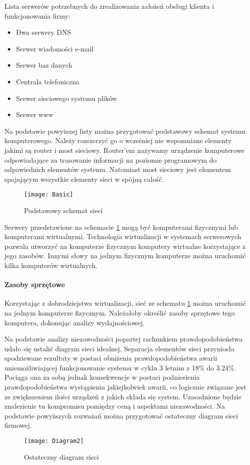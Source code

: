 		
			Lista serwerów potrzebnych do zrealizowania założeń obsługi klienta i funkcjonowania firmy: 
			\begin{itemize}
				\item Dwa serwery DNS
				\item Serwer wiadomości e-mail
				\item Serwer baz danych
				\item Centrala telefoniczna
				\item Serwer sieciowego systemu plików
				\item Serwer www
			\end{itemize}
		
			Na podstawie powyższej listy można przygotować podstawowy schemat systemu komputerowego. Należy rozszerzyć go o wcześniej nie wspomniane elementy jakimi są router i most sieciowy. Router'em nazywamy urządzenie komputerowe odpowiadające za trasowanie informacji na poziomie programowym do odpowiednich elementów systemu. Natomiast most sieciowy jest elementem spajającym wszystkie elementy sieci w spójną całość.
		
			\begin{figure}[H]
				\centering
				\texttt{[image: Basic]}
				\caption{Podstawowy schemat sieci}
				\label{basic_net}
			\end{figure}
			
			\par Serwery przedstawione na schemacie \ref{basic_net} mogą być komputerami fizycznymi lub komputerami wirtualnymi. Technologia wirtualizacji w systemach serwerowych pozwala utworzyć na komputerze fizycznym komputery wirtualne korzystające z jego zasobów. Innymi słowy na jednym fizycznym komputerze można uruchomić kilka komputerów wirtualnych. 
		
		\paragraph{Zasoby sprzętowe}
			\par Korzystając z dobrodziejstwa wirtualizacji, sieć ze schematu \ref{basic_net} można uruchomić na jednym komputerze fizycznym. Należałoby określić zasoby sprzętowe tego komputera, dokonując analizy wydajnościowej.
		
			\par Na podstawie analizy niezawodności popartej rachunkiem prawdopodobieństwa udało się ustalić diagram sieci idealnej. Separacja elementów sieci przyniosła spodziewane rezultaty w postaci obniżenia prawdopodobieństwa awarii uniemożliwiającej funkcjonowanie systemu w cyklu 3 letnim z 18\% do 3.24\%. Pociąga ona za sobą jednak konsekwencje w postaci podniesienia prawdopodobieństwa wystąpienia jakiejkolwiek awarii, co logicznie związane jest ze zwiększeniem ilości urządzeń z jakich składa się system. Uzasadnione będzie znalezienie tu kompromisu pomiędzy ceną i aspektami niezawodności. Na podstawie powyższych rozważań można przygotować ostateczny diagram sieci firmowej.
		
		\begin{figure}[H]
			\centering
			\texttt{[image: Diagram2]}
			\caption{Ostateczny diagram sieci}
			\label{net_real}
		\end{figure}
 
 
